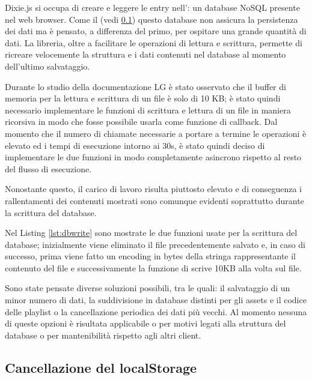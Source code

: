 Dixie.js si occupa di creare e leggere le entry nell': un database NoSQL presente nel web browser. Come il  (vedi \ref*{freestorage}) questo database non assicura la persistenza dei dati ma è pensato, a differenza del primo, per ospitare una grande quantità di dati. La libreria, oltre a facilitare le operazioni di lettura e scrittura, permette di ricreare velocemente la struttura e i dati contenuti nel database al momento dell'ultimo salvataggio.

Durante lo studio della documentazione LG è stato osservato che il buffer di memoria per la lettura e scrittura di un file è solo di 10 KB; è stato quindi necessario implementare le funzioni di scrittura e lettura di un file in maniera ricorsiva in modo che fosse possibile usarla come funzione di callback.
Dal momento che il numero di chiamate necessarie a portare a termine le operazioni è elevato ed i tempi di esecuzione intorno ai 30s, è stato quindi deciso di implementare le due funzioni in modo completamente asincrono rispetto al resto del flusso di esecuzione. 

Nonostante questo, il carico di lavoro risulta piuttosto elevato e di conseguenza i rallentamenti dei contenuti mostrati sono comunque evidenti soprattutto durante la scrittura del database. 



Nel Listing \ref*{lst:dbwrite} sono mostrate le due funzioni usate per la scrittura del database; inizialmente viene eliminato il file precedentemente salvato e, in caso di successo, prima viene fatto un encoding in bytes della stringa rappresentante il contenuto del file e successivamente la funzione di  scrive 10KB alla volta sul file.

Sono state pensate diverse soluzioni possibili, tra le quali: il salvataggio di un minor numero di dati, la suddivisione in database distinti per gli assets e il codice delle playlist o la cancellazione periodica dei dati più vecchi. Al momento nessuna di queste opzioni è risultata applicabile o per motivi legati alla struttura del database o per mantenibilità rispetto agli altri client.

\subsection{Cancellazione del localStorage} \label{freestorage}

